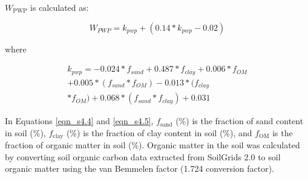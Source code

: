 \noindent $W_\mathrm{PWP}$ is calculated as:

\begin{equation}
    \label{eqn_s4.4} \tag{C4.4}
    W_{PWP}=k_{pwp}+(0.14*k_{pwp}-0.02)	
\end{equation}

\noindent where

\begin{equation}
    \label{eqn_s4.5} \tag{C4.5}
    \begin{aligned}
        k_{pwp} = -0.024 * f_{sand} + 0.487 * f_{clay} + 0.006 * f_{OM} \\ + 0.005 * (f_{sand} * f_{OM}) - 0.013 * (f_{clay} \\ * f_{OM}) + 0.068 * (f_{sand} * f_{clay}) + 0.031
    \end{aligned}
\end{equation}

\noindent In Equations \ref{eqn_s4.4} and \ref{eqn_s4.5}, $f_\mathrm{sand}$ (\%) is the fraction of sand content in soil (\%), $f_\mathrm{clay}$ (\%) is the fraction of clay content in soil (\%), and $f_\mathrm{OM}$ is the fraction of organic matter in soil (\%). Organic matter in the soil was calculated by converting soil organic carbon data extracted from SoilGrids 2.0 to soil organic matter using the van Bemmelen factor (1.724 conversion factor).
\clearpage


